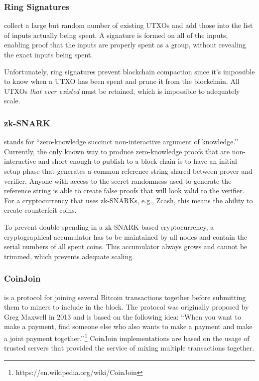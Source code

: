 \documentclass[8pt,fleqn,openany]{book}
\begin{document}
\subsubsection{Ring Signatures} collect a large but random number of existing UTXOs and add those into the list of inputs actually being spent. A signature is formed on all of the inputs, enabling proof that the inputs are properly spent as a group, without revealing the exact inputs being spent. 

Unfortunately, ring signatures prevent blockchain compaction since it’s impossible to know when a UTXO has been spent and prune it from the blockchain. All UTXOs \textit{that ever existed} must be retained, which is impossible to adequately scale.

\subsubsection{zk-SNARK} stands for ``zero-knowledge succinct non-interactive argument of knowledge.’’ Currently, the only known way to produce zero-knowledge proofs that are non-interactive and short enough to publish to a block chain is to have an initial setup phase that generates a common reference string shared between prover and verifier. Anyone with access to the secret randomness used to generate the reference string is able to create false proofs that will look valid to the verifier. For a cryptocurrency that uses zk-SNARKs, e.g., Zcash, this means the ability to create counterfeit coins. 

To prevent double-spending in a zk-SNARK-based cryptocurrency, a cryptographical accumulator has to be maintained by all nodes and contain the serial numbers of all spent coins. This accumulator always grows and cannot be trimmed, which prevents adequate scaling.

\subsubsection{CoinJoin} is a protocol for joining several Bitcoin transactions together before submitting them to miners to include in the block. The protocol was originally proposed by Greg Maxwell in 2013 and is based on the following idea: ``When you want to make a payment, find someone else who also wants to make a payment and make a joint payment together.’’\footnote{https://en.wikipedia.org/wiki/CoinJoin} CoinJoin implementations are based on the usage of trusted servers that provided the service of mixing multiple transactions together.
\end{document}
